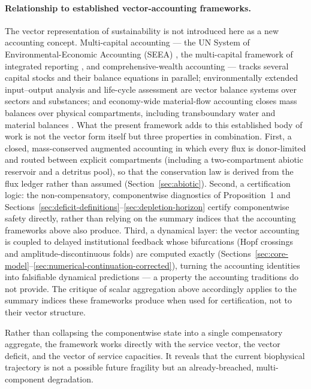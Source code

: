 \documentclass[twocolumn,10pt]{article}
\begin{document}
\paragraph{Relationship to established vector-accounting frameworks.} The vector representation of sustainability is not introduced here as a new accounting concept. Multi-capital accounting --- the UN System of Environmental-Economic Accounting (SEEA) \cite{seea2014}, the multi-capital framework of integrated reporting \cite{iirc2013}, and comprehensive-wealth accounting \cite{cwon2021,dasgupta2021} --- tracks several capital stocks and their balance equations in parallel; environmentally extended input--output analysis \cite{leontief1970} and life-cycle assessment \cite{iso14040} are vector balance systems over sectors and substances; and economy-wide material-flow accounting \cite{eurostat2001} closes mass balances over physical compartments, including transboundary water and material balances \cite{hoekstra2002}. What the present framework adds to this established body of work is not the vector form itself but three properties in combination. First, a closed, mass-conserved augmented accounting in which every flux is donor-limited and routed between explicit compartments (including a two-compartment abiotic reservoir and a detritus pool), so that the conservation law is derived from the flux ledger rather than assumed (Section~\ref{sec:abiotic}). Second, a certification logic: the non-compensatory, componentwise diagnostics of Proposition~1 and Sections~\ref{sec:deficit-definitions}--\ref{sec:depletion-horizon} certify componentwise safety directly, rather than relying on the summary indices that the accounting frameworks above also produce. Third, a dynamical layer: the vector accounting is coupled to delayed institutional feedback whose bifurcations (Hopf crossings and amplitude-discontinuous folds) are computed exactly (Sections~\ref{sec:core-model}--\ref{sec:numerical-continuation-corrected}), turning the accounting identities into falsifiable dynamical predictions --- a property the accounting traditions do not provide. The critique of scalar aggregation above accordingly applies to the summary indices these frameworks produce when used for certification, not to their vector structure.

Rather than collapsing the componentwise state into a single compensatory aggregate, the framework works directly with the service vector, the vector deficit, and the vector of service capacities. It reveals that the current biophysical trajectory is not a possible future fragility but an already-breached, multi-component degradation.
\end{document}
